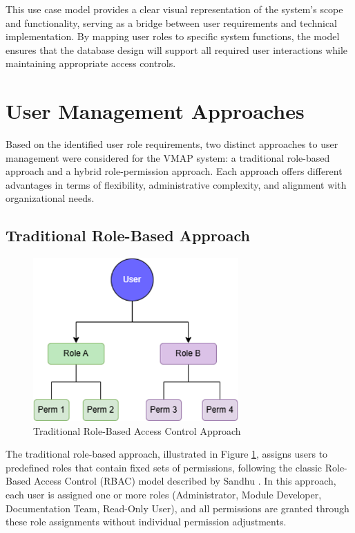 This use case model provides a clear visual representation of the system's scope and functionality, serving as a bridge between user requirements and technical implementation. By mapping user roles to specific system functions, the model ensures that the database design will support all required user interactions while maintaining appropriate access controls.

\section{User Management Approaches}
\label{sec:user-management-approaches}

Based on the identified user role requirements, two distinct approaches to user management were considered for the VMAP system: a traditional role-based approach and a hybrid role-permission approach. Each approach offers different advantages in terms of flexibility, administrative complexity, and alignment with organizational needs.

\subsection{Traditional Role-Based Approach}
\label{subsec:traditional-role-approach}

\begin{figure}[h]
    \centering
    \includegraphics[width=0.7\textwidth]{figures/traditional_rbac_model.png}
    \caption{Traditional Role-Based Access Control Approach}
    \label{fig:traditional-rbac}
\end{figure}

The traditional role-based approach, illustrated in Figure \ref{fig:traditional-rbac}, assigns users to predefined roles that contain fixed sets of permissions, following the classic Role-Based Access Control (RBAC) model described by Sandhu \cite{sandhu1998role}. In this approach, each user is assigned one or more roles (Administrator, Module Developer, Documentation Team, Read-Only User), and all permissions are granted through these role assignments without individual permission adjustments.

